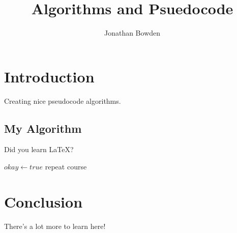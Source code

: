 \documentclass{article}
\title{Algorithms and Psuedocode}
\author{Jonathan Bowden}
\begin{document}
\maketitle

\section{Introduction}

Creating nice pseudocode algorithms.

\subsection{My Algorithm}

Did you learn \LaTeX?

\begin{algorithmic}

		\State $okay \gets true$
	\Else
			\State repeat course
		\EndWhile
	\EndIf
	
\end{algorithmic}

\section{Conclusion}

There's a lot more to learn here!
\end{document}
